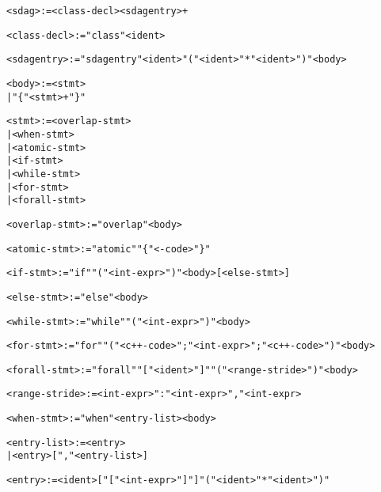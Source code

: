 \begin{alltt}
<sdag> := <class-decl> <sdagentry>+ 

<class-decl> := "class" <ident> 

<sdagentry> := "sdagentry" <ident> "(" <ident> "*" <ident> ")" <body> 

<body> := <stmt> 
        | "\{" <stmt>+ "\}" 

<stmt> := <overlap-stmt> 
        | <when-stmt> 
        | <atomic-stmt> 
        | <if-stmt> 
        | <while-stmt> 
        | <for-stmt> 
        | <forall-stmt> 

<overlap-stmt> := "overlap" <body> 

<atomic-stmt> := "atomic" "\{" <\CC-code> "\}" 

<if-stmt> := "if" "(" <int-expr> ")" <body> [<else-stmt>] 

<else-stmt> := "else" <body> 

<while-stmt> := "while" "(" <int-expr> ")" <body> 

<for-stmt> := "for" "(" <c++-code> ";" <int-expr> ";" <c++-code> ")" <body> 

<forall-stmt> := "forall" "[" <ident> "]" "(" <range-stride> ")" <body> 

<range-stride> := <int-expr> ":" <int-expr> "," <int-expr> 

<when-stmt> := "when" <entry-list>  <body> 

<entry-list> := <entry> 
              | <entry> [ "," <entry-list> ] 

<entry> := <ident> [ "[" <int-expr> "]" ] "(" <ident> "*" <ident> ")" 
  
\end{alltt}

